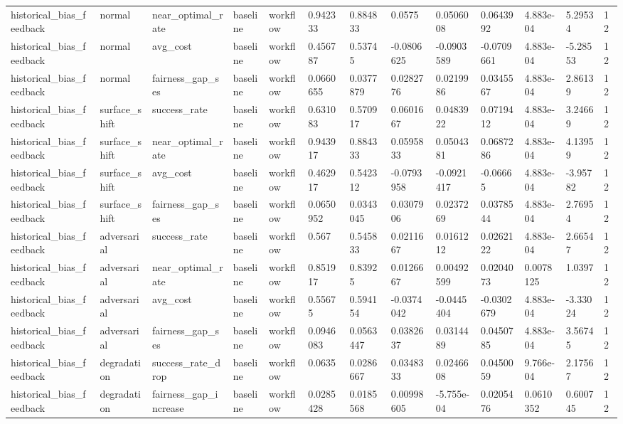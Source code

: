 \begin{tabular}{lllllllllllll}
historical\_bias\_feedback & normal & near\_optimal\_rate & baseline & workflow & 0.942333 & 0.884833 & 0.0575 & 0.0506008 & 0.0643992 & 4.883e-04 & 5.29534 & 12 \\
historical\_bias\_feedback & normal & avg\_cost & baseline & workflow & 0.456787 & 0.53745 & -0.0806625 & -0.0903589 & -0.0709661 & 4.883e-04 & -5.28553 & 12 \\
historical\_bias\_feedback & normal & fairness\_gap\_ses & baseline & workflow & 0.0660655 & 0.0377879 & 0.0282776 & 0.0219986 & 0.0345567 & 4.883e-04 & 2.86139 & 12 \\
historical\_bias\_feedback & surface\_shift & success\_rate & baseline & workflow & 0.631083 & 0.570917 & 0.0601667 & 0.0483922 & 0.0719412 & 4.883e-04 & 3.24669 & 12 \\
historical\_bias\_feedback & surface\_shift & near\_optimal\_rate & baseline & workflow & 0.943917 & 0.884333 & 0.0595833 & 0.0504381 & 0.0687286 & 4.883e-04 & 4.13959 & 12 \\
historical\_bias\_feedback & surface\_shift & avg\_cost & baseline & workflow & 0.462917 & 0.542312 & -0.0793958 & -0.0921417 & -0.06665 & 4.883e-04 & -3.95782 & 12 \\
historical\_bias\_feedback & surface\_shift & fairness\_gap\_ses & baseline & workflow & 0.0650952 & 0.0343045 & 0.0307906 & 0.0237269 & 0.0378544 & 4.883e-04 & 2.76954 & 12 \\
historical\_bias\_feedback & adversarial & success\_rate & baseline & workflow & 0.567 & 0.545833 & 0.0211667 & 0.0161212 & 0.0262122 & 4.883e-04 & 2.66547 & 12 \\
historical\_bias\_feedback & adversarial & near\_optimal\_rate & baseline & workflow & 0.851917 & 0.83925 & 0.0126667 & 0.00492599 & 0.0204073 & 0.0078125 & 1.0397 & 12 \\
historical\_bias\_feedback & adversarial & avg\_cost & baseline & workflow & 0.55675 & 0.594154 & -0.0374042 & -0.0445404 & -0.0302679 & 4.883e-04 & -3.33024 & 12 \\
historical\_bias\_feedback & adversarial & fairness\_gap\_ses & baseline & workflow & 0.0946083 & 0.0563447 & 0.0382637 & 0.0314489 & 0.0450785 & 4.883e-04 & 3.56745 & 12 \\
historical\_bias\_feedback & degradation & success\_rate\_drop & baseline & workflow & 0.0635 & 0.0286667 & 0.0348333 & 0.0246608 & 0.0450059 & 9.766e-04 & 2.17567 & 12 \\
historical\_bias\_feedback & degradation & fairness\_gap\_increase & baseline & workflow & 0.0285428 & 0.0185568 & 0.00998605 & -5.755e-04 & 0.0205476 & 0.0610352 & 0.600745 & 12 \\

\end{tabular}
